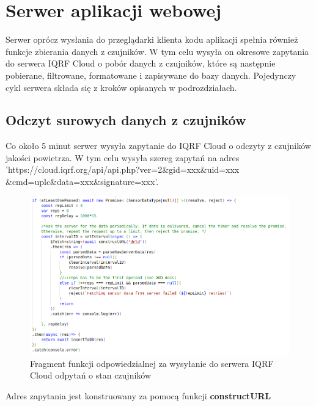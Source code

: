\section{Serwer aplikacji webowej}

Serwer oprócz wysłania do przeglądarki klienta kodu aplikacji spełnia również funkcje zbierania danych z czujników. W tym celu wysyła on okresowe zapytania
do serwera IQRF Cloud o pobór danych z czujników, które są następnie pobierane, filtrowane, formatowane i zapisywane do bazy danych. Pojedynczy cykl serwera składa
się z kroków opisanych w podrozdziałach.

\subsection{Odczyt surowych danych z czujników}
Co około 5 minut serwer wysyła zapytanie do IQRF Cloud o odczyty z czujników jakości powietrza. W tym celu wysyła szereg zapytań na adres \\
'https://cloud.iqrf.org/api/api.php?ver=2\&gid=xxx\&uid=xxx\\\&cmd=uplc\&data=xxx\&signature=xxx'.

\begin{figure}[H]
    \includegraphics[width=\textwidth]{zdj/app/poll-fragment.png}
    \caption{Fragment funkcji odpowiedzialnej za wysyłanie do serwera IQRF Cloud odpytań o stan czujników}
\end{figure}

Adres zapytania jest konstruowany za pomocą funkcji \textbf{constructURL}

